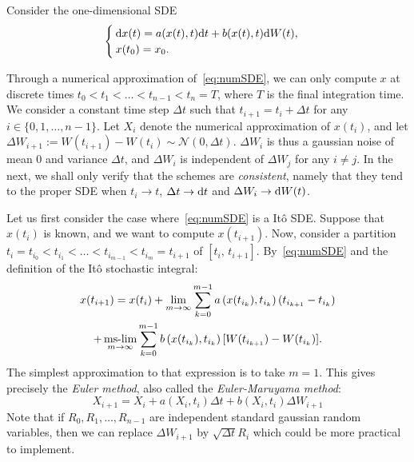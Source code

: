 Consider the one-dimensional SDE
\begin{equation} \label{eq:numSDE}
	\begin{cases}
		\rm dx(t) = a(x(t),t) \rm dt + b(x(t),t) \rm dW(t),\\
		x(t_0) = x_0. 
	\end{cases}
\end{equation}
\begin{sloppypar}
Through a numerical approximation of~\eqref{eq:numSDE}, we can only compute $x$ at discrete times $t_0 < t_1  < \dots < t_{n-1} < t_n = T$, where $T$ is the final integration time. We consider a constant time step $\Delta t$ such that $t_{i+1} = t_i + \Delta t$ for any $i \in \{0,1,\dots,n-1\}$. Let $X_i$ denote the numerical approximation of $x(t_i)$, and let $\Delta W_{i+1} := W(t_{i+1}) - W(t_i) \sim \mathcal{N}(0,\Delta t)$. $\Delta W_i$ is thus a gaussian noise of mean $0$ and variance $\Delta t$, and $\Delta W_i$ is independent of $\Delta W_j$ for any $i \neq j$. In the next, we shall only verify that the schemes are \textit{consistent}, namely that they tend to the proper SDE when $t_i \rightarrow t$, $\Delta t \rightarrow \rm dt$ and $\Delta W_i \rightarrow \rm dW(t)$.
\end{sloppypar}

Let us first consider the case where~\eqref{eq:numSDE} is a Itô SDE. Suppose that $x(t_i)$ is known, and we want to compute $x(t_{i+1})$. Now, consider a partition $t_i = t_{i_0} < t_{i_1} < \dots < t_{i_{m-1}} < t_{i_m} = t_{i+1}$ of $[t_i,\, t_{i+1}]$. By~\eqref{eq:numSDE} and the definition of the Itô stochastic integral: 
\begin{multline}
	x(t_{i+1}) = x(t_{i}) + \lim_{m\rightarrow\infty} \sum_{k=0}^{m-1} a\left(x(t_{i_k}),t_{i_k}\right)(t_{i_{k+1}} - t_{i_{k}})\\ + \mslim_{m\rightarrow\infty} \sum_{k=0}^{m-1} b\left(x(t_{i_{k}}),t_{i_k}\right)[W(t_{i_{k+1}}) - W(t_{i_{k}})].
\end{multline}
The simplest approximation to that expression is to take $m=1$. This gives precisely the \textit{Euler method}, also called the \textit{Euler-Maruyama method}:
\begin{equation}
	X_{i+1} = X_i + a(X_i,t_i) \Delta t + b(X_i,t_i) \Delta W_{i+1}
\end{equation}
Note that if $R_0,R_1,\dots,R_{n-1}$ are independent standard gaussian random variables, then we can replace $\Delta W_{i+1}$ by $\sqrt{\Delta t}R_i$ which could be more practical to implement.


